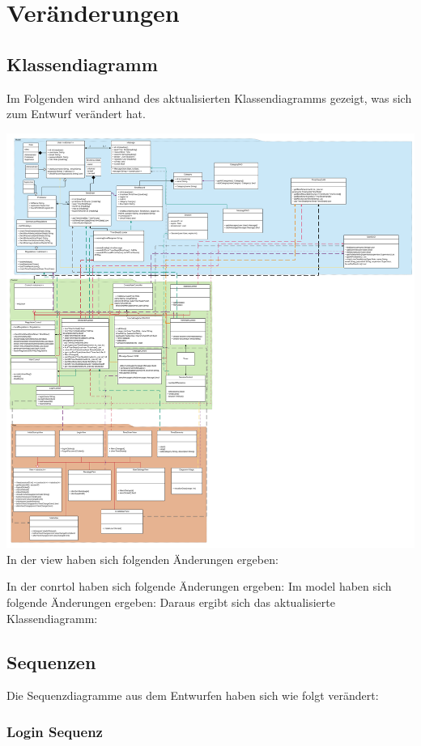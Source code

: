 \section{Veränderungen}
\subsection{Klassendiagramm}
Im Folgenden wird anhand des aktualisierten Klassendiagramms gezeigt, was sich zum Entwurf verändert hat.

\includegraphics{Class-Diagramm_alt.pdf}
In der view haben sich folgenden Änderungen ergeben:

In der conrtol haben sich folgende Änderungen ergeben:
Im model haben sich folgende Änderungen ergeben: %
Daraus ergibt sich das aktualisierte Klassendiagramm:


\subsection{Sequenzen}
Die Sequenzdiagramme aus dem Entwurfen haben sich wie folgt verändert:
\subsubsection{Login Sequenz}

